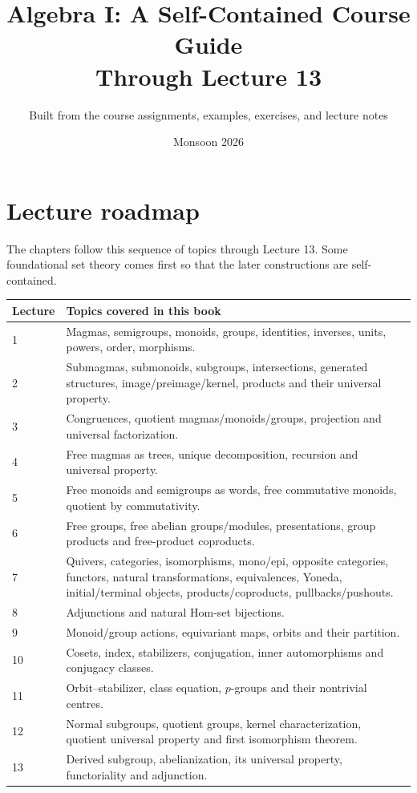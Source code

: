 \documentclass[11pt,openany]{book}
\title{Algebra I: A Self-Contained Course Guide\\\large Through Lecture 13}
\author{Built from the course assignments, examples, exercises, and lecture notes}
\date{Monsoon 2026}
\theoremstyle{definition}
\begin{document}
\frontmatter\maketitle\tableofcontents

\section*{Lecture roadmap}
The chapters follow this sequence of topics through Lecture 13. Some foundational set theory comes first so that the later constructions are self-contained.
\begin{center}\small
\begin{tabular}{@{}p{}p{}@{}}\toprule
Lecture&Topics covered in this book\\\midrule
1&Magmas, semigroups, monoids, groups, identities, inverses, units, powers, order, morphisms.\\
2&Submagmas, submonoids, subgroups, intersections, generated structures, image/preimage/kernel, products and their universal property.\\
3&Congruences, quotient magmas/monoids/groups, projection and universal factorization.\\
4&Free magmas as trees, unique decomposition, recursion and universal property.\\
5&Free monoids and semigroups as words, free commutative monoids, quotient by commutativity.\\
6&Free groups, free abelian groups/modules, presentations, group products and free-product coproducts.\\
7&Quivers, categories, isomorphisms, mono/epi, opposite categories, functors, natural transformations, equivalences, Yoneda, initial/terminal objects, products/coproducts, pullbacks/pushouts.\\
8&Adjunctions and natural Hom-set bijections.\\
9&Monoid/group actions, equivariant maps, orbits and their partition.\\
10&Cosets, index, stabilizers, conjugation, inner automorphisms and conjugacy classes.\\
11&Orbit--stabilizer, class equation, $p$-groups and their nontrivial centres.\\
12&Normal subgroups, quotient groups, kernel characterization, quotient universal property and first isomorphism theorem.\\
13&Derived subgroup, abelianization, its universal property, functoriality and adjunction.\\\bottomrule
\end{tabular}
\end{center}
\end{document}
